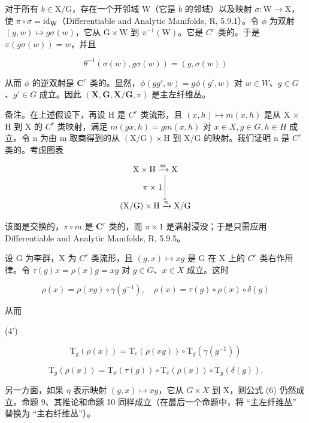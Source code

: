 对于所有 \(b \in \mathrm{X} / \mathrm{G}\)，存在一个开邻域 \(\mathrm{W}\)（它是 \(b\) 的邻域）以及映射 \(\sigma: \mathrm{W} \to \mathrm{X}\)，使 \(\pi \circ \sigma = \mathrm{id}_{\mathbf{W}}\)（Differentiable and Analytic Manifolds, R, 5.9.1）。令 \(\phi\) 为双射 \((g, w) \mapsto g\sigma(w)\)，它从 \(\mathrm{G} \times \mathrm{W}\) 到 \(\pi^{-1}(\mathrm{W})\)。它是 \(C^r\) 类的。于是 \(\pi(g\sigma(w)) = w\)，并且

\[
\theta^ {- 1} (\sigma (w), g \sigma (w)) = (g, \sigma (w))
\]

从而 \(\phi\) 的逆双射是 \(\mathbf{C}^r\) 类的。显然，\(\phi(gg', w) = g\phi(g', w)\) 对 \(w \in W\)、\(g \in G\)、\(g' \in G\) 成立。因此 \((\mathbf{X}, \mathbf{G}, \mathbf{X}/\mathbf{G}, \pi)\) 是主左纤维丛。

备注。在上述假设下，再设 H 是 \(C^{r}\) 类流形，且 \((x, h) \mapsto m(x, h)\) 是从 X × H 到 X 的 \(C^{r}\) 类映射，满足 \(m(gx, h) = gm(x, h)\) 对 \(x \in X, g \in G, h \in H\) 成立。令 n 为由 m 取商得到的从 \((\mathrm{X}/\mathrm{G}) \times \mathrm{H}\) 到 X/G 的映射。我们证明 n 是 \(C^{r}\) 类的。考虑图表

\[
\begin{array}{c} \mathrm{X} \times \mathrm{H} \xrightarrow {m} \mathrm{X} \\ \pi \times 1 \Biggl \downarrow \\ (\mathrm{X} / \mathrm{G}) \times \mathrm{H} \xrightarrow {n} \mathrm{X} / \mathrm{G} \end{array}
\]

该图是交换的，\(\pi \circ m\) 是 \(\mathbf{C}^r\) 类的，而 \(\pi \times 1\) 是满射浸没；于是只需应用 Differentiable and Analytic Manifolds, R, 5.9.5。

设 G 为李群，X 为 \(C^{r}\) 类流形，且 \((g, x) \mapsto xg\) 是 G 在 X 上的 \(C^{r}\) 类右作用律。令 \(\tau(g)x = \rho(x)g = xg\) 对 \(g \in G\)、\(x \in X\) 成立。这时

\[
\rho (x) = \rho (x g) \circ \gamma (g ^ {- 1}), \quad \rho (x) = \tau (g) \circ \rho (x) \circ \delta (g)\tag{3'}
\]

从而

(4')

\[
\mathrm{T} _ {g} (\rho (x)) = \mathrm{T} _ {e} (\rho (x g)) \circ \mathrm{T} _ {g} (\gamma (g ^ {- 1}))\tag{5'}
\]

\[
\mathrm{T} _ {g} (\rho (x)) = \mathrm{T} _ {x} (\tau (g)) \circ \mathrm{T} _ {e} (\rho (x)) \circ \mathrm{T} _ {g} (\delta (g)).
\]

另一方面，如果 \(\eta\) 表示映射 \((g, x) \mapsto xg\)，它从 \(G \times X\) 到 X，则公式 (6) 仍然成立。命题 9、其推论和命题 10 同样成立（在最后一个命题中，将 ``主左纤维丛'' 替换为 ``主右纤维丛''）。

